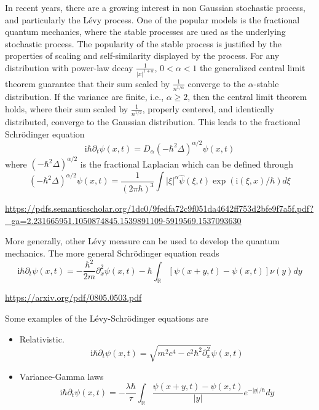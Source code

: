 \documentclass[10pt,a4paper]{article}
\newcommand{\ii}[0]{\mathrm{i}}
\newcommand{\RR}[0]{\mathbb{R}}
\theoremstyle{definition}
\begin{document}
In recent years, there are a growing interest in non Gaussian stochastic process, and particularly the L\'evy process. One of the popular models is the fractional quantum mechanics, where the stable processes are used as the underlying stochastic process. The popularity of the stable process is justified by the properties of scaling and self-similarity displayed by the process. For any distribution with power-law decay $\frac{1}{|x|^{1+\alpha}}$, $0<\alpha<1$ the generalized central limit theorem guarantee that their sum scaled by $\frac{1}{n^{1/\alpha}}$ converge to the $\alpha$-stable distribution. If the variance are finite, i.e., $\alpha\geq 2$, then the central limit theorem holds, where  their sum scaled by $\frac{1}{n^{1/2}}$, properly centered, and identically distributed, converge to the Gaussian distribution.  This leads to the fractional Schr\"odinger equation
\begin{equation}
	\ii \hbar \partial_t \psi(x,t) = D_\alpha (-\hbar^2 \Delta)^{\alpha/2}\psi(x,t)
\end{equation}
where $(-\hbar^2 \Delta)^{\alpha/2}$ is the fractional Laplacian which can be defined through
\begin{equation}
	(-\hbar^2 \Delta)^{\alpha/2}\psi(x,t) = \frac{1}{(2\pi \hbar)^3}\int |\xi|^\alpha \hat \psi(\xi,t) \exp(\ii (\xi,x)/\hbar)d\xi
\end{equation}

\url{https://pdfs.semanticscholar.org/1dc0/9fedfa72c9f051da4642ff753d2bfe9f7a5f.pdf?_ga=2.231665951.1050874845.1539891109-5919569.1537093630}

More generally, other L\'evy measure can be used to develop the quantum mechanics. The more general Schr\"odinger equation reads
\begin{equation}
	\ii \hbar\partial_t \psi(x,t) = -\frac{\hbar^2}{2m}\partial_x^2 \psi(x,t) - \hbar  \int_\RR [\psi(x+y,t)-\psi(x,t)]\nu(y)dy
\end{equation}

\url{https://arxiv.org/pdf/0805.0503.pdf}

Some examples of the L\'evy-Schr\"odinger equations are
\begin{itemize}
	\item Relativistic.
	\begin{equation}
		\ii \hbar\partial_t \psi(x,t) = \sqrt{m^2c^4-c^2\hbar^2\partial_x^2} \psi(x,t)
	\end{equation}
	\item Variance-Gamma laws
	\begin{equation}
		\ii \hbar\partial_t \psi(x,t) = -\frac{\lambda\hbar}{\tau}\int_\RR\frac{\psi(x+y,t)-\psi(x,t)}{|y|}e^{-|y|/\hbar}dy
	\end{equation}

\end{itemize}
\end{document}
